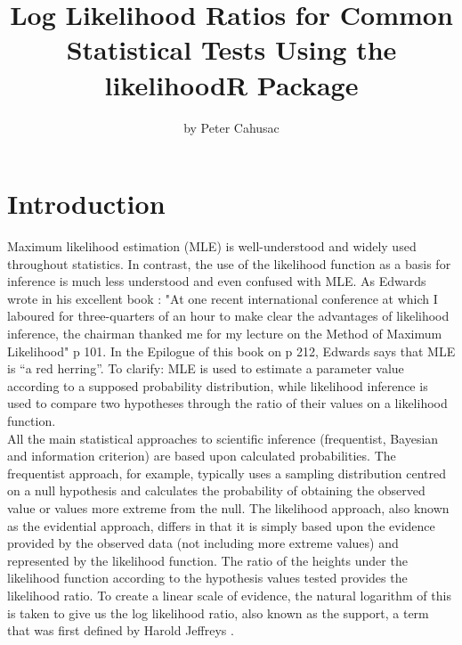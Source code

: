 \title{Log Likelihood Ratios for Common Statistical Tests Using the likelihoodR Package}
\author{by Peter Cahusac}

\maketitle


\section{Introduction}

Maximum likelihood estimation (MLE) is well-understood and widely used throughout statistics. In contrast, the use of the likelihood function as a basis for inference is much less understood and even confused with MLE. As Edwards wrote in his excellent book : "At one recent international conference at which I laboured for three-quarters of an hour to make clear the advantages of likelihood inference, the chairman thanked me for my lecture on the Method of Maximum Likelihood" \citep{Edwards:1992} p 101. In the Epilogue of this book on p 212, Edwards says that MLE is “a red herring”. To clarify: MLE is used to estimate a parameter value according to a supposed probability distribution, while likelihood inference is used to compare two hypotheses through the ratio of their values on a likelihood function.\\

All the main statistical approaches to scientific inference (frequentist, Bayesian and information criterion) are based upon calculated probabilities. The frequentist approach, for example, typically uses a sampling distribution centred on a null hypothesis and calculates the probability of obtaining the observed value or values more extreme from the null. The likelihood approach, also known as the evidential approach, differs in that it is simply based upon the evidence provided by the observed data (not including more extreme values) and represented by the likelihood function. The ratio of the heights under the likelihood function according to the hypothesis values tested provides the likelihood ratio. To create a linear scale of evidence, the natural logarithm of this is taken to give us the log likelihood ratio, also known as the support, a term that was first defined by Harold Jeffreys \citep{Jeffreys:1936}.\\

